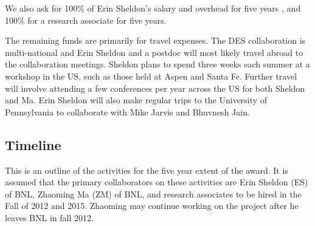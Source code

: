 \documentclass[12pt]{article}
\begin{document}
We also ask for 100\%  of Erin Sheldon's salary and overhead for five years ,
and 100\% for a research associate for five years.  

The remaining funds are primarily for travel expenses.   The DES collaboration
is multi-national and Erin Sheldon and a postdoc will most likely travel abroad
to the collaboration meetings.  Sheldon plans to spend three weeks each summer
at a workshop in the US, such as those held at Aspen and Santa Fe.  Further
travel will involve attending a few conferences per year across the US for both
Sheldon and Ma.  Erin Sheldon will also make regular trips to the University of
Pennsylvania to collaborate with Mike Jarvis and Bhuvnesh Jain.

\clearpage
\newpage
\subsection{Timeline}

This is an outline of the activities for the five year extent of the award.  It
is assumed that the primary collaborators on these activities are Erin Sheldon
(ES) of BNL, Zhaoming Ma (ZM) of BNL, and research associates to be hired in
the Fall of 2012 and 2015.  Zhaoming may continue working on the project after
he leaves BNL in fall 2012.
\end{document}

